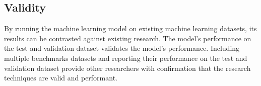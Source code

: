\subsection{Validity}

By running the machine learning model on existing machine learning datasets, its results can be contrasted against existing research.  The model's performance on the test and validation dataset validates the model's performance.  Including multiple benchmarks datasets and reporting their performance on the test and validation dataset provide other researchers with confirmation that the research techniques are valid and performant.  

